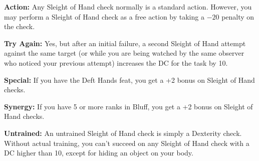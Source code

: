 \textbf{Action:} Any Sleight of Hand check normally is a standard action. However, you may perform a Sleight of Hand check as a free action by taking a $-20$ penalty on the check.

\textbf{Try Again:} Yes, but after an initial failure, a second Sleight of Hand attempt against the same target (or while you are being watched by the same observer who noticed your previous attempt) increases the DC for the task by 10.

\textbf{Special:} If you have the Deft Hands feat, you get a +2 bonus on Sleight of Hand checks.

\textbf{Synergy:} If you have 5 or more ranks in Bluff, you get a +2 bonus on Sleight of Hand checks.

\textbf{Untrained:} An untrained Sleight of Hand check is simply a Dexterity check. Without actual training, you can't succeed on any Sleight of Hand check with a DC higher than 10, except for hiding an object on your body.

